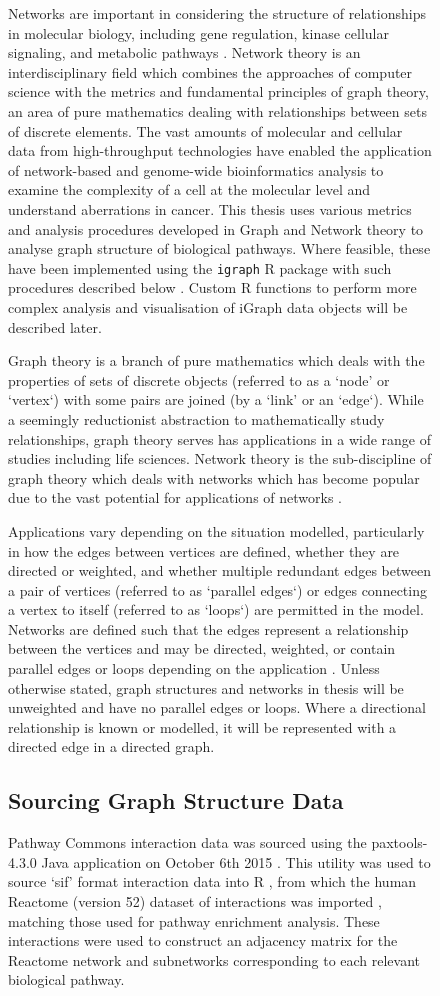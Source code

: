 \begin{figure}[!htp]
Networks are important in considering the structure of relationships in molecular biology, including gene regulation, kinase cellular signaling, and metabolic pathways \citep{Barabasi2004}. Network theory is an interdisciplinary field which combines the approaches of computer science with the metrics and fundamental principles of graph theory, an area of pure mathematics dealing with relationships between sets of discrete elements. The vast amounts of molecular and cellular data from high-throughput technologies have enabled the application of network-based and genome-wide bioinformatics analysis to examine the complexity of a cell at the molecular level and understand aberrations in cancer. This thesis uses various metrics and analysis procedures developed in Graph and Network theory to analyse graph structure of biological pathways. Where feasible, these have been implemented using the \texttt{igraph} R package with such procedures described below \citep{igraph}. Custom R functions to perform more complex analysis and visualisation of iGraph data objects will be described later.

Graph theory is a branch of pure mathematics which deals with the properties of sets of discrete objects (referred to as a `node' or `vertex`) with some pairs are joined (by a `link' or an `edge`). While a seemingly reductionist abstraction to mathematically study relationships, graph theory serves has applications in a wide range of studies including life sciences. Network theory is the sub-discipline of graph theory which deals with networks which has become popular due to the vast potential for applications of networks \citep{vanSteen2010}. 

Applications vary depending on the situation modelled, particularly in how the edges between vertices are defined, whether they are directed or weighted, and whether multiple redundant edges between a pair of vertices (referred to as `parallel edges`) or edges connecting a vertex to itself (referred to as `loops`) are permitted in the model. Networks are defined such that the edges represent a relationship between the vertices and may be directed, weighted, or contain parallel edges or loops depending on the application \citep{vanSteen2010}. Unless otherwise stated, graph structures and networks in thesis will be unweighted and have no parallel edges or loops. Where a directional relationship is known or modelled, it will be represented with a directed edge in a directed graph.

\subsection{Sourcing Graph Structure Data} \label{methods:graph_data}
Pathway Commons interaction data was sourced using the paxtools-4.3.0 Java application on October 6th 2015 \citep{PathwayCommons, paxtools}. This utility was used to source `sif' format interaction data into R \citep{R_core}, from which the human Reactome (version 52) dataset of interactions was imported \citep{Reactome}, matching those used for pathway enrichment analysis. These interactions were used to construct an adjacency matrix for the Reactome network and subnetworks corresponding to each relevant biological pathway. 


\end{figure}
